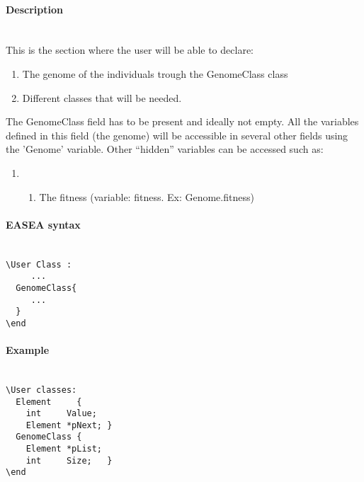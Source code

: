 \documentclass{book}
\begin{document}
\paragraph{Description}\label{description-2}
~\\

This is the section where the user will be able to declare:

\begin{enumerate}
\itemsep1pt\parskip0pt
\item
  The genome of the individuals trough the GenomeClass class
\item
  Different classes that will be needed.
\end{enumerate}

The GenomeClass field has to be present and ideally not empty. All the
variables defined in this field (the genome) will be accessible in
several other fields using the 'Genome' variable. Other ``hidden''
variables can be accessed such as:

\begin{enumerate}
\item
  \begin{enumerate}
  \itemsep1pt\parskip0pt
  \item
    The fitness (variable: fitness. Ex: Genome.fitness)
  \end{enumerate}
\end{enumerate}

\paragraph{EASEA syntax}\label{easea-syntax-2}
~\\

\texttt{\textbackslash{}User~Class~:}\\\texttt{~~~~~...}\\\texttt{~~GenomeClass\{}\\\texttt{~~~~~...}\\\texttt{~~\}}\\\texttt{\textbackslash{}end}

\paragraph{Example}\label{example-2}
~\\

\texttt{\textbackslash{}User~classes:}\\\texttt{~~Element~~~~~\{~}\\\texttt{~~~~int~~~~~Value;}\\\texttt{~~~~Element~*pNext;~\}}\\\texttt{~~GenomeClass~\{~}\\\texttt{~~~~Element~*pList;~}\\\texttt{~~~~int~~~~~Size;~~~\}}\\\texttt{\textbackslash{}end}
\end{document}
